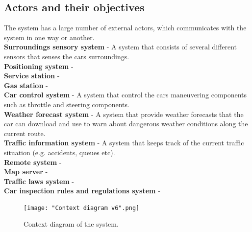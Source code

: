 \documentclass{article}
\begin{document}
\subsection{Actors and their objectives}
\noindent The system has a large number of external actors, which communicates with the system in one way or another. \\
\noindent
\noindent\textbf{Surroundings sensory system} - A system that consists of several different sensors that senses the cars surroundings.  \\
\textbf{Positioning system} - \\
\textbf{Service station} - \\
\textbf{Gas station} - \\
\textbf{Car control system} - A system that control the cars maneuvering components such as throttle and steering components. \\
\textbf{Weather forecast system} - A system that  provide weather forecasts that the car can download and use to warn about dangerous weather conditions along the current route.  \\
\textbf{Traffic information system} - A system that keeps track of the current traffic situation (e.g. accidents, queues etc). \\
\textbf{Remote system} - \\
\textbf{Map server} - \\
\textbf{Traffic laws system} - \\
\textbf{Car inspection rules and regulations system} - \\
\begin{figure}[htb]    
 \centering
  \texttt{[image: "Context diagram v6".png]}%
  \caption{Context diagram of the system.}
  \label{ContextDiagram}
\end{figure}
\bigskip
\end{document}

